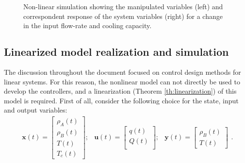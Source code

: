 \documentclass[a4paper,11pt]{book}
\numberwithin{figure}{chapter}
\numberwithin{equation}{chapter}
\numberwithin{table}{chapter}
\theoremstyle{definition}
\begin{document}
\begin{figure}[ht]
	
	\caption{Non-linear simulation showing the manipulated variables (left) and correspondent response of the system variables (right) for a change in the input flow-rate and cooling capacity.}
	\label{fig:dynamics03}
\end{figure}

\subsection{Linearized model realization and simulation}

The discussion throughout the document focused on control design methods for linear systems. For this reason, the nonlinear model can not directly be used to develop the controllers, and a linearization (Theorem \ref{th:linearization}) of this model is required. First of all, consider the following choice for the state, input and output variables:
\begin{equation}
\begin{matrix}
	\bm{x}(t) = \begin{bmatrix}
		\rho_A(t) \\ 
		\rho_B(t) \\ 
		T(t) \\ 
		T_c(t)
	\end{bmatrix}; & \bm{u}(t) = \begin{bmatrix}
		q(t) \\ 
		Q(t) \\
	\end{bmatrix}; & \bm{y}(t) = \begin{bmatrix}
		\rho_B(t) \\ 
		T(t)
	\end{bmatrix}
\end{matrix}
.\end{equation}
\end{document}
